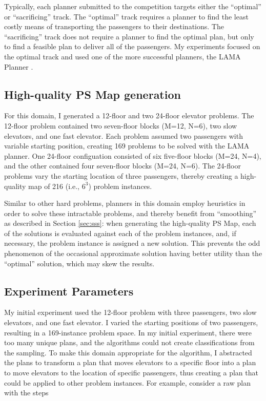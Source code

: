 Typically, each planner submitted to the competition targets either the ``optimal'' or ``sacrificing'' track. The ``optimal'' track requires a planner to find the least costly means of transporting the passengers to their destinations.  The ``sacrificing'' track does not require a planner to find the optimal plan, but only to find a feasible plan to deliver all of the passengers.  My experiments focused on the optimal track and used one of the more successful planners, the LAMA Planner \citep{richter2010lama}.

\subsection{High-quality PS Map generation}  For this domain, I generated a 12-floor and two 24-floor elevator problems.  The 12-floor problem contained two seven-floor blocks (M=12, N=6), two slow elevators, and one fast elevator.  Each problem assumed two passengers with variable starting position, creating 169 problems to be solved with the LAMA planner.  One 24-floor configuation consisted of six five-floor blocks (M=24, N=4), and the other contained four seven-floor blocks (M=24, N=6).  The 24-floor problems vary the starting location of three passengers, thereby creating a high-quality map of 216 (i.e., $6^3$) problem instances.


Similar to other hard problems, planners in this domain employ heuristics in order to solve these intractable problems, and thereby benefit from ``smoothing'' as described in Section \ref{sec:sss}:  when generating the high-quality PS Map, each of the solutions is evaluated against each of the problem instances, and, if necessary, the problem instance is assigned a new solution.  This prevents the odd phenomenon of the occasional approximate solution having better utility than the ``optimal'' solution, which may skew the results.

\subsection{Experiment Parameters} My initial experiment used the 12-floor problem with three passengers, two slow elevators, and one fast elevator.  I varied the starting positions of two passengers, resulting in a 169-instance problem space.  In my initial experiment, there were too many unique plans, and the algorithms could not create classifications from the sampling. To make this domain appropriate for the algorithm, I abstracted the plans to transform a plan that moves elevators to a specific floor into a plan to move elevators to the location of specific passengers, thus creating a plan that could be applied to other problem instances.  For example, consider a raw plan with the steps

